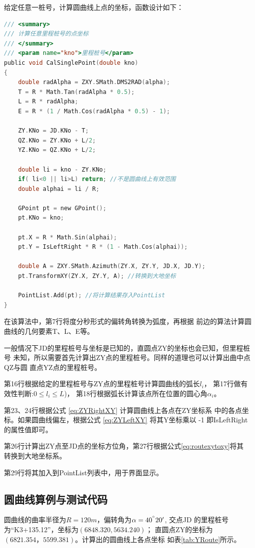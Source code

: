 给定任意一桩号，计算圆曲线上点的坐标，函数设计如下：
\begin{lstlisting}[language=C]
/// <summary>
/// 计算任意里程桩号的点坐标
/// </summary>
/// <param name="kno">里程桩号</param>
public void CalSinglePoint(double kno)
{
    double radAlpha = ZXY.SMath.DMS2RAD(alpha);
    T = R * Math.Tan(radAlpha * 0.5);
    L = R * radAlpha;
    E = R * (1 / Math.Cos(radAlpha * 0.5) - 1);

    ZY.KNo = JD.KNo - T;
    QZ.KNo = ZY.KNo + L/2;
    YZ.KNo = QZ.KNo + L/2;

    double li = kno - ZY.KNo;
    if( li<0 || li>L) return; //不是圆曲线上有效范围
    double alphai = li / R;

    GPoint pt = new GPoint();
    pt.KNo = kno;

    pt.X = R * Math.Sin(alphai);
    pt.Y = IsLeftRight * R * (1 - Math.Cos(alphai));

    double A = ZXY.SMath.Azimuth(ZY.X, ZY.Y, JD.X, JD.Y);
    pt.TransformXY(ZY.X, ZY.Y, A); //转换到大地坐标

    PointList.Add(pt); //将计算结果存入PointList
}
\end{lstlisting}

在该算法中，第7行将度分秒形式的偏转角转换为弧度，再根据
前边的算法计算圆曲线的几何要素T、L、E等。

一般情况下JD的里程桩号与坐标是已知的，直圆点ZY的坐标也会已知，但里程桩号
未知，所以需要首先计算出ZY点的里程桩号。同样的道理也可以计算出曲中点QZ与圆
直点YZ点的里程桩号。

第16行根据给定的里程桩号与ZY点的里程桩号计算圆曲线的弧长$l_i$，
第17行做有效性判断:$0 \le l_i \le L$)，
第18行根据弧长计算该点所在位置的圆心角$\alpha_i$。

第23、24行根据公式 \ref{eq:ZYRightXY} 计算圆曲线上各点在ZY坐标系
中的各点坐标。如果圆曲线偏左，根据公式 \ref{eq:ZYLeftXY} 将其Y坐标乘以
 -1 即IsLeftRight的属性值即可。

第26行计算出ZY点至JD点的坐标方位角，第27行根据公式\ref{eq:routexytoxy}将其
转换到大地坐标系。

第29行将其加入到PointList列表中，用于界面显示。

\subsection{圆曲线算例与测试代码}
圆曲线的曲率半径为$R=120m$，偏转角为$\alpha=40^{^\circ}20'$, 交点JD
的里程桩号为``K3+135.12''，坐标为$(6848.320, 5634.240)$；
直圆点ZY的坐标为$(6821.354，5599.381)$。计算出的圆曲线上各点坐标
如表\ref{tab:YRoute}所示。

